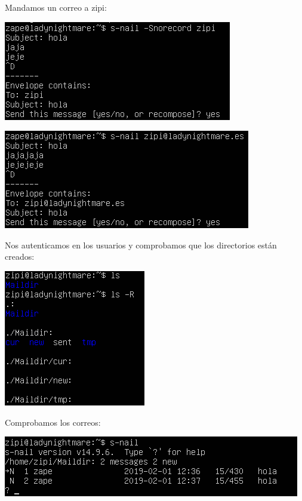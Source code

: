 \documentclass{article}
\begin{document}
Mandamos un correo a zipi:

\begin{center}
\includegraphics[scale=0.6]{images/correo.png}
\end{center}

\begin{center}
\includegraphics[scale=0.6]{images/mail.png}
\end{center}

Nos autenticamos en los usuarios y comprobamos que los directorios están creados:

\begin{center}
\includegraphics[scale=0.6]{images/dir.png}
\end{center}

Comprobamos los correos:

\begin{center}
\includegraphics[scale=0.6]{images/correos.png}
\end{center}
\end{document}

